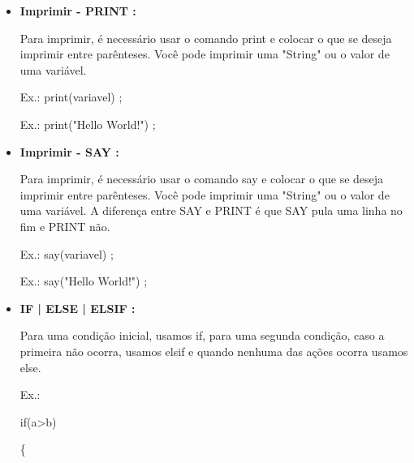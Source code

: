 \documentclass[a4paper]{article}
\begin{document}
{{{{\begin{itemize}
        \item \textbf{Imprimir - PRINT : }
        
            Para imprimir, é necessário usar o
            comando 
            \textcolor{NavyBlue}{print} e
            colocar o que se deseja imprimir entre
            parênteses.
            Você pode imprimir uma "String" ou o 
            valor de uma variável.
            
            \textcolor{NavyBlue}{Ex.:}
            \textcolor{NavyBlue}{print(variavel)}
            ;
            
            \textcolor{NavyBlue}{Ex.:}
            \textcolor{NavyBlue}{print("Hello World!")}
            ;
       
       \bigskip
            
       \item \textbf{Imprimir - SAY : }
        
            Para imprimir, é necessário usar o
            comando 
            \textcolor{NavyBlue}{say} e
            colocar o que se deseja imprimir entre
            parênteses.
            Você pode imprimir uma "String" ou o 
            valor de uma variável.
            A diferença entre SAY e PRINT é que
            SAY pula uma linha no fim e PRINT não.
            
            \textcolor{NavyBlue}{Ex.:}
            \textcolor{NavyBlue}{say(variavel)}
            ;
            
            \textcolor{NavyBlue}{Ex.:}
            \textcolor{NavyBlue}{say("Hello World!")}
            ;
        
            
\newpage %
            
            
        \item \textbf{IF | ELSE | ELSIF : }
            
            Para uma condição inicial, usamos
            \textcolor{NavyBlue}{if},
            para uma segunda condição, caso a 
            primeira não ocorra, usamos
            \textcolor{NavyBlue}{elsif}
            e quando nenhuma das ações ocorra
            usamos 
            \textcolor{NavyBlue}{else}.
            
            \textcolor{NavyBlue}{Ex.:}
            
            \textcolor{NavyBlue}{if(a>b)}
            
            \{
            

\end{itemize}}}}}
\end{document}
